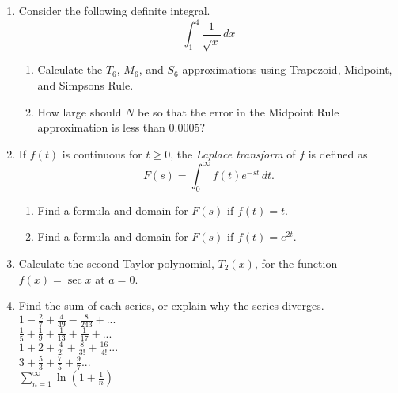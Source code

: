 \documentclass[11pt]{article}
\begin{document}
\begin{enumerate}
\vspace{0.2in}

\item {Consider the following definite integral. 
\begin{displaymath}
\int_1^4 \frac{1}{\sqrt{x}}\, dx
\end{displaymath}
\begin{enumerate}
\item{Calculate the $T_6$, $M_6$, and $S_6$ approximations using Trapezoid, Midpoint, and Simpsons Rule.}
\item{How large should $N$ be so that the error in the Midpoint Rule approximation is less than 0.0005?}
\end{enumerate}
}

  \pagebreak
  
\item{If $f(t)$ is continuous for $t\ge 0$, the \emph{Laplace transform} of $f$ is defined as 
\begin{displaymath}
F(s) = \int_{0}^{\infty}f(t)e^{-st} \, dt.
\end{displaymath}

\begin{enumerate}
\item{Find a formula and domain for $F(s)$ if $f(t) = t$.}
  \item{Find a formula and domain for $F(s)$ if $f(t) = e^{2t}$.}
\end{enumerate}
}


  \item {Calculate the second Taylor polynomial, $T_2(x)$, for the function $f(x)=\sec{x}$ at $a=0$.  
  }

  \item{Find the sum of each series, or explain why the series diverges.\\

    $ 1 - \frac{2}{7} + \frac{4}{49} - \frac{8}{243} + ...$\\

        $ \frac{1}{5} + \frac{1}{9} + \frac{1}{13} +  \frac{1}{17} + ...$\\

    $ 1 + 2 + \frac{4}{2!} + \frac{8}{3!} + \frac{16}{4!} ...$\\

          $3 +  \frac{5}{3} + \frac{7}{5} + \frac{9}{7} ...$\\

    $\sum_{n=1}^{\infty}\ln{\left(1+\frac{1}{n}  \right)}$

}
\end{enumerate}
\end{document}
